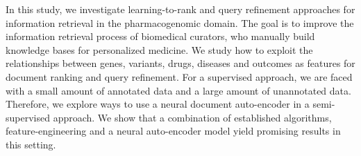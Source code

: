 In this study, we investigate learning-to-rank and query refinement approaches for information retrieval in the pharmacogenomic domain. The goal is to improve the information retrieval process of biomedical curators, who manually build knowledge bases for personalized medicine. We study how to exploit the relationships between genes, variants, drugs, diseases and outcomes as features for document ranking and query refinement. For a supervised approach, we are faced with a small amount of annotated data and a large amount of unannotated data. Therefore, we explore ways to use a neural document auto-encoder in a semi-supervised approach. We show that a combination of established algorithms, feature-engineering and a neural auto-encoder model yield promising results in this setting.
